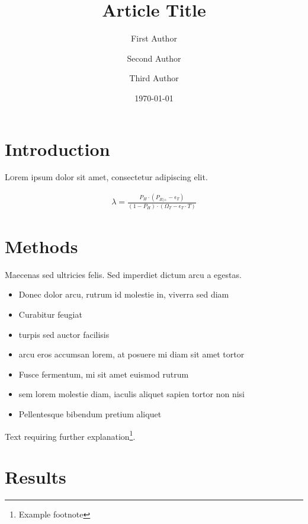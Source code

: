 \documentclass[a4paper,10pt]{article} %
\title{Article Title} %
\author[1†]{First Author}
\author[2†*]{Second Author}
\author[3]{Third Author}
\affil[1]{First Affiliation}
\affil[2]{Second Affiliation}
\affil[3]{Third Affiliation}
\affil[†]{These authors contributed equally.}
\affil[*]{\href{mailto:eduardgrebe@sun.ac.za}{eduardgrebe@sun.ac.za}}
\date{\today} %
\begin{document}
\maketitle


\section{Introduction}

\lettrine[nindent=0em,lines=3]{L} orem ipsum dolor sit amet, consectetur adipiscing elit.
\blindtext %

\begin{eqnarray}
\label{eq:kassanjee}
\lambda = \frac{P_H \cdot (P_{R|+}-\epsilon_T)}{(1 - P_H) \cdot (\Omega_T - \epsilon_T \cdot T)}
\end{eqnarray}

\blindtext %


\section{Methods}

Maecenas sed ultricies felis. Sed imperdiet dictum arcu a egestas.
\begin{itemize}
\item Donec dolor arcu, rutrum id molestie in, viverra sed diam
\item Curabitur feugiat
\item turpis sed auctor facilisis
\item arcu eros accumsan lorem, at posuere mi diam sit amet tortor
\item Fusce fermentum, mi sit amet euismod rutrum
\item sem lorem molestie diam, iaculis aliquet sapien tortor non nisi
\item Pellentesque bibendum pretium aliquet
\end{itemize}
\blindtext %

Text requiring further explanation\footnote{Example footnote}.


\section{Results}
\end{document}
